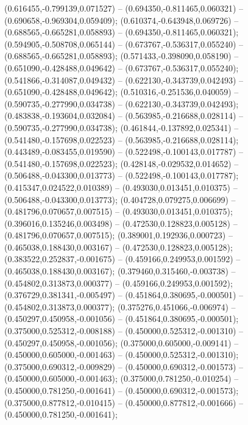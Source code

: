  (0.616455,-0.799139,0.071527) -- (0.694350,-0.811465,0.060321) -- (0.690658,-0.969304,0.059409);
 (0.610374,-0.643948,0.069726) -- (0.688565,-0.665281,0.058893) -- (0.694350,-0.811465,0.060321);
 (0.594905,-0.508708,0.065144) -- (0.673767,-0.536317,0.055240) -- (0.688565,-0.665281,0.058893);
 (0.571433,-0.398090,0.058190) -- (0.651090,-0.428488,0.049642) -- (0.673767,-0.536317,0.055240);
 (0.541866,-0.314087,0.049432) -- (0.622130,-0.343739,0.042493) -- (0.651090,-0.428488,0.049642);
 (0.510316,-0.251536,0.040059) -- (0.590735,-0.277990,0.034738) -- (0.622130,-0.343739,0.042493);
 (0.483838,-0.193604,0.032084) -- (0.563985,-0.216688,0.028114) -- (0.590735,-0.277990,0.034738);
 (0.461844,-0.137892,0.025341) -- (0.541480,-0.157698,0.022523) -- (0.563985,-0.216688,0.028114);
 (0.443489,-0.083455,0.019590) -- (0.522498,-0.100143,0.017787) -- (0.541480,-0.157698,0.022523);
 (0.428148,-0.029532,0.014652) -- (0.506488,-0.043300,0.013773) -- (0.522498,-0.100143,0.017787);
 (0.415347,0.024522,0.010389) -- (0.493030,0.013451,0.010375) -- (0.506488,-0.043300,0.013773);
 (0.404728,0.079275,0.006699) -- (0.481796,0.070657,0.007515) -- (0.493030,0.013451,0.010375);
 (0.396016,0.135246,0.003498) -- (0.472530,0.128823,0.005128) -- (0.481796,0.070657,0.007515);
 (0.389001,0.192936,0.000723) -- (0.465038,0.188430,0.003167) -- (0.472530,0.128823,0.005128);
 (0.383522,0.252837,-0.001675) -- (0.459166,0.249953,0.001592) -- (0.465038,0.188430,0.003167);
 (0.379460,0.315460,-0.003738) -- (0.454802,0.313873,0.000377) -- (0.459166,0.249953,0.001592);
 (0.376729,0.381341,-0.005497) -- (0.451864,0.380695,-0.000501) -- (0.454802,0.313873,0.000377);
 (0.375276,0.451066,-0.006974) -- (0.450297,0.450958,-0.001056) -- (0.451864,0.380695,-0.000501);
 (0.375000,0.525312,-0.008188) -- (0.450000,0.525312,-0.001310) -- (0.450297,0.450958,-0.001056);
 (0.375000,0.605000,-0.009141) -- (0.450000,0.605000,-0.001463) -- (0.450000,0.525312,-0.001310);
 (0.375000,0.690312,-0.009829) -- (0.450000,0.690312,-0.001573) -- (0.450000,0.605000,-0.001463);
 (0.375000,0.781250,-0.010254) -- (0.450000,0.781250,-0.001641) -- (0.450000,0.690312,-0.001573);
 (0.375000,0.877812,-0.010415) -- (0.450000,0.877812,-0.001666) -- (0.450000,0.781250,-0.001641);
